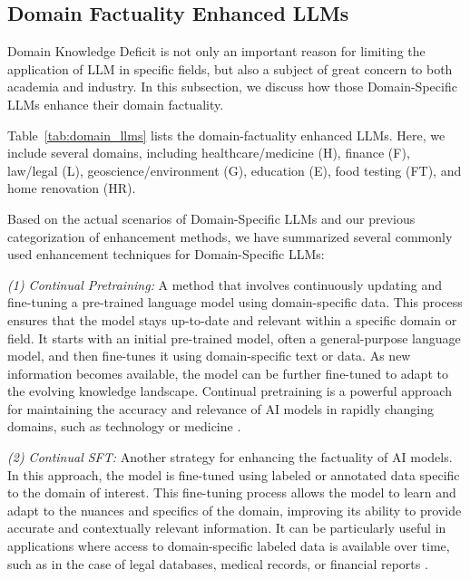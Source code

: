\subsection{Domain Factuality Enhanced LLMs}
\label{sec:domain_llms}

Domain Knowledge Deficit is not only an important reason for limiting the application of LLM in specific fields, but also a subject of great concern to both academia and industry. In this subsection, we discuss how those Domain-Specific LLMs enhance their domain factuality.



Table~\ref{tab:domain_llms} lists the domain-factuality enhanced LLMs. Here, we include several domains, including healthcare/medicine (H), finance (F), law/legal (L), geoscience/environment (G), education (E), food testing (FT), and home renovation (HR). 

Based on the actual scenarios of Domain-Specific LLMs and our previous categorization of enhancement methods, we have summarized several commonly used enhancement techniques for Domain-Specific LLMs: %

\emph{(1) Continual Pretraining: } A method that involves continuously updating and fine-tuning a pre-trained language model using domain-specific data. This process ensures that the model stays up-to-date and relevant within a specific domain or field. It starts with an initial pre-trained model, often a general-purpose language model, and then fine-tunes it using domain-specific text or data. As new information becomes available, the model can be further fine-tuned to adapt to the evolving knowledge landscape. Continual pretraining is a powerful approach for maintaining the accuracy and relevance of AI models in rapidly changing domains, such as technology or medicine \citep{zhang2023huatuogpt,yang2023zhongjing}.

\emph{(2)
Continual SFT: }  Another strategy for enhancing the factuality of AI models. In this approach, the model is fine-tuned using labeled or annotated data specific to the domain of interest. This fine-tuning process allows the model to learn and adapt to the nuances and specifics of the domain, improving its ability to provide accurate and contextually relevant information. It can be particularly useful in applications where access to domain-specific labeled data is available over time, such as in the case of legal databases, medical records, or financial reports \citep{bao2023disc,li2023chatdoctor}.

